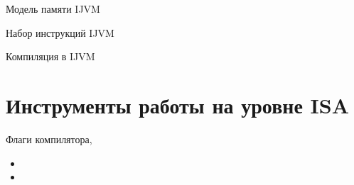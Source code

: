 \begin{frame}{Модель памяти IJVM}
\end{frame}

\begin{frame}{Набор инструкций IJVM}
\end{frame}


\begin{frame}{Компиляция в IJVM}
\end{frame}

\section{Инструменты работы на уровне ISA}

\begin{frame}{Флаги компилятора, }

\begin{itemize}\itemsep=1cm
  \item {}

  \item {}
\end{itemize}

\end{frame}


